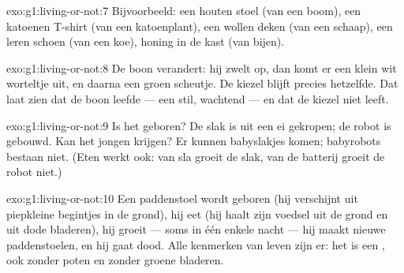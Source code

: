 \begin{solution}{exo:g1:living-or-not:7}
Bijvoorbeeld: een houten stoel (van een boom), een katoenen T-shirt
(van een katoenplant), een wollen deken (van een schaap), een leren
schoen (van een koe), honing in de kast (van bijen).
\end{solution}

\begin{solution}{exo:g1:living-or-not:8}
De boon verandert: hij zwelt op, dan komt er een klein wit worteltje
uit, en daarna een groen scheutje. De kiezel blijft precies hetzelfde.
Dat laat zien dat de boon leefde --- een stil, wachtend  ---
en dat de kiezel niet leeft.
\end{solution}

\begin{solution}{exo:g1:living-or-not:9}
Is het geboren? De slak is uit een ei gekropen; de robot is gebouwd.
Kan het jongen krijgen? Er kunnen babyslakjes komen; babyrobots
bestaan niet. (Eten werkt ook: van sla groeit de slak, van de batterij
groeit de robot niet.)
\end{solution}

\begin{solution}{exo:g1:living-or-not:10}
Een paddenstoel wordt geboren (hij verschijnt uit piepkleine begintjes
in de grond), hij eet (hij haalt zijn voedsel uit de grond en uit dode
bladeren), hij groeit --- soms in één enkele nacht --- hij maakt nieuwe
paddenstoelen, en hij gaat dood. Alle kenmerken van leven zijn er: het
is een , ook zonder poten en zonder groene bladeren.
\end{solution}
